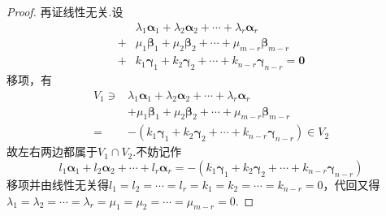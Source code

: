{\begin{proof}
        再证线性无关.设
        \begin{align*}
              & \lambda_1\bm{\alpha}_1+\lambda_2\bm{\alpha}_2+\cdots+\lambda_r
            \bm{\alpha}_r
            \\
            + & \mu_1\bm{\beta}_1+\mu_2
            \bm{\beta}_2+\cdots+\mu_{m-r}
            \bm{\beta}_{m-r}                                                   \\
            + & k_1
            \bm{\gamma}_1+k_2
            \bm{\gamma}_2+\cdots+k_{n-r}\bm{\gamma}_{n-r}
            =\bm{0}
        \end{align*}
        移项，有
        \begin{align*}
            V_1\ni & \lambda_1\bm{\alpha}_1+\lambda_2\bm{\alpha}_2+\cdots+\lambda_r
            \bm{\alpha}_r
            \\
                   & +\mu_1\bm{\beta}_1+\mu_2
            \bm{\beta}_2+\cdots+\mu_{m-r}
            \bm{\beta}_{m-r}                                                        \\
            =      & -\left(k_1
            \bm{\gamma}_1+k_2
            \bm{\gamma}_2+\cdots+k_{n-r}\bm{\gamma}_{n-r}
            \right)\in V_2
        \end{align*}
        故左右两边都属于$V_1\cap V_2.$不妨记作
        \[
            l_1\bm{\alpha}_1+l_2\bm{\alpha}_2+\cdots+l_r\bm{\alpha}_r
            =-\left(k_1
            \bm{\gamma}_1+k_2
            \bm{\gamma}_2+\cdots+k_{n-r}\bm{\gamma}_{n-r}
            \right)
        \]
        移项并由线性无关得$l_1=l_2=\cdots=l_r=k_1=k_2=\cdots=k_{n-r}=0$，代回又得$\lambda_1=\lambda_2=\cdots=\lambda_r=\mu_1=\mu_2=\cdots=\mu_{m-r}=0$.
    \end{proof}
}
